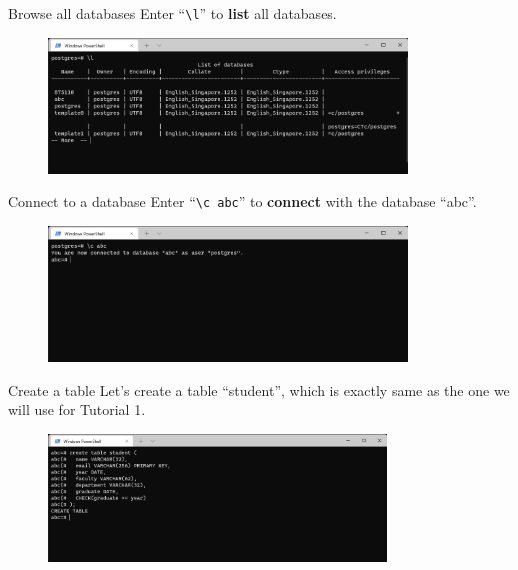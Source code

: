 \begin{frame}[fragile]{Browse all databases}
	Enter ``\texttt{\textbackslash l}'' to \textbf{list} all databases.
	\begin{figure}
		\includegraphics[width=0.85\textwidth]{t0-psql/images/2.png}
	\end{figure}
	
\end{frame}

\begin{frame}[fragile]{Connect to a database}
	Enter ``\texttt{\textbackslash c abc}'' to \textbf{connect} with the database ``abc''.
	\begin{figure}
		\includegraphics[width=0.85\textwidth]{t0-psql/images/4.png}
	\end{figure}
	
\end{frame}

\begin{frame}[fragile]{Create a table}
	Let's create a table ``student'', which is exactly same as the one we will use for Tutorial 1.
	\begin{figure}
		\includegraphics[width=0.8\textwidth]{t0-psql/images/5.png}
	\end{figure}
	
\end{frame}

